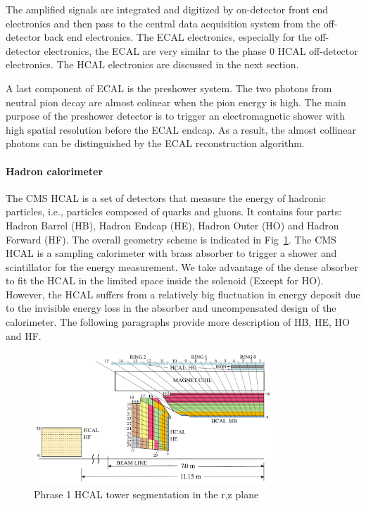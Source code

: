 The amplified signals are integrated and digitized by on-detector front end electronics and then pass to the central data acquisition system from the off-detector back end electronics. The ECAL electronics, especially for the off-detector electronics, the ECAL are very similar to the phase 0 HCAL off-detector electronics. The HCAL electronics are discussed in the next section.

A last component of ECAL is the preshower system. The two photons from neutral pion decay are almost colinear when the pion energy is high. The main purpose of the preshower detector is to trigger an electromagnetic shower with high spatial resolution before the ECAL endcap. As a result, the almost collinear photons can be distinguished by the ECAL reconstruction algorithm. 

\paragraph{Hadron calorimeter}

The CMS HCAL is a set of detectors that measure the energy of hadronic particles, i.e., particles composed of quarks and gluons. It contains four parts: Hadron Barrel (HB), Hadron Endcap (HE), Hadron Outer (HO) and Hadron Forward (HF). The overall geometry scheme is indicated in Fig~\ref{fig:c3cms2dhcal}. The CMS HCAL is a sampling calorimeter with brass absorber to trigger a shower and scintillator for the energy measurement. We take advantage of the dense absorber to fit the HCAL in the limited space inside the solenoid (Except for HO). However, the HCAL suffers from a relatively big fluctuation in energy deposit due to the invisible energy loss in the absorber and uncompensated design of the calorimeter. The following paragraphs provide more description of HB, HE, HO and HF.

\begin{figure}[htbp]
 \begin{center}
  \includegraphics[width=0.8\textwidth]{figures/c3/c3_cms_2dhcal.pdf}
 \end{center}
 \caption{Phrase 1 HCAL tower segmentation in the r,z plane}
 \label{fig:c3cms2dhcal}
\end{figure}

